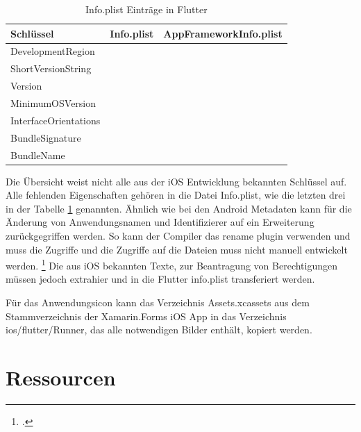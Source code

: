 \begin{table}[!ht]
  \begin{tabularx}{\linewidth}{|l|X|X|}
  \hline

  \textbf{Schlüssel}  &  \textbf{Info.plist} & \textbf{AppFrameworkInfo.plist} \\
\hline
  DevelopmentRegion  		&  					& 		\checkmark	 \\
  ShortVersionString  		&  					& 		\checkmark	 \\
  Version  							&  					& 		\checkmark	 \\
  MinimumOSVersion  		&  					& 		\checkmark	 \\
  
  InterfaceOrientations  		& \checkmark  	&		 					\\
  BundleSignature  			&  \checkmark 	& 							\\
  BundleName  					&  \checkmark 	& 		 					\\
  \hline
\end{tabularx}
\caption{Info.plist Einträge in Flutter}
 \label{tab:InfoPlist}
\end{table}
Die Übersicht weist nicht alle aus der iOS Entwicklung bekannten Schlüssel auf.  Alle fehlenden Eigenschaften gehören in die Datei \glq Info.plist\grq, wie die letzten drei in der Tabelle \ref{tab:InfoPlist} genannten.  Ähnlich wie bei den Android Metadaten kann für die Änderung von Anwendungsnamen und Identifizierer auf ein Erweiterung zurückgegriffen werden.  So kann der Compiler das \glq rename\grq{}  plugin verwenden und muss die Zugriffe und die Zugriffe auf die Dateien muss nicht manuell entwickelt werden. \footcite[Vgl.][Abgerufen am \today]{Rename}  Die aus iOS bekannten Texte,  zur Beantragung von Berechtigungen müssen jedoch extrahier und in die Flutter info.plist transferiert werden.

Für das Anwendungsicon kann das Verzeichnis \glq Assets.xcassets\grq{} aus dem Stammverzeichnis der Xamarin.Forms iOS App in das Verzeichnis \glq ios/flutter/Runner\grq , das alle notwendigen Bilder enthält,  kopiert werden. 

\section{Ressourcen}

